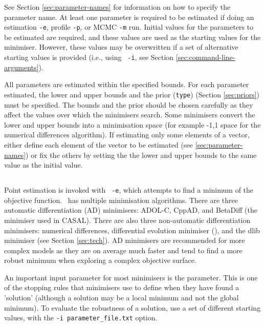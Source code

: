 See Section \ref{sec:parameter-names} for information on how to specify the parameter name. At least one parameter is required to be estimated if doing an estimation \texttt{-e}, profile \texttt{-p}, or MCMC \texttt{-m} run. Initial values for the parameters to be estimated are required, and these values are used as the starting values for the minimiser. However, these values may be overwritten if a set of alternative starting values is provided (i.e., using \texttt{\cname\ -i}, see Section \ref{sec:command-line-arguments}).

All parameters are estimated within the specified bounds. For each parameter estimated, the lower and upper bounds and the prior (\texttt{type}) (Section \ref{sec:priors}) must be specified. The bounds and the prior should be chosen carefully as they affect the values over which the minimisers search. Some minimisers convert the lower and upper bounds into a minimisation space (for example -1,1 space for the numerical differences algorithm). If estimating only some elements of a vector, either define each element of the vector to be estimated (see \ref{sec:parameter-names}) or fix the others by setting the the lower and upper bounds to the same value as the initial value.

\subsection{\label{sec:estimate-MPD}}

Point estimation is invoked with \texttt{\cname\ -e}, which attempts to find a minimum of the objective function. \CNAME\ has multiple minimisation algorithms. There are three automatic differentiation (AD) minimisers: ADOL-C, CppAD, and BetaDiff (the minimiser used in CASAL). There are also three non-automatic differentiation minimisers: numerical differences, differential evolution minimiser (), and the dlib minimiser (see Section \ref{sec:tech}). AD minimisers are recommended for more complex models as they are on average much faster and tend to find a more robust minimum when exploring a complex objective surface.

An important input parameter for most minimisers is the  parameter. This is one of the stopping rules that minimisers use to define when they have found a 'solution' (although a solution may be a local minimum and not the global minimum). To evaluate the robustness of a solution, use a set of different starting values, with the \texttt{-i parameter\_file.txt} option.

